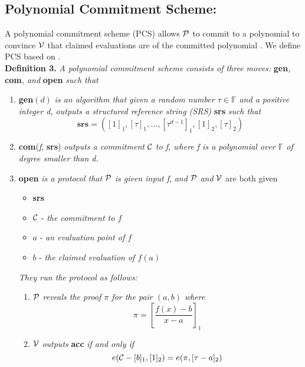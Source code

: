 \subsection{Polynomial Commitment Scheme:}\label{sec:pcs} A polynomial commitment scheme (PCS) allows $\mathcal{P}$ to commit to a polynomial to convince $\mathcal{V}$ that claimed evaluations are of the committed polynomial \cite{kzg}. We define PCS based on \cite{kzg,plonk,bdfg}. \\
\textbf{Definition 3.} \textit{A polynomial commitment scheme consists of three moves:} \textbf{gen}\textit{,} \textbf{com}\textit{, and} \textbf{open} \textit{such that}
\begin{enumerate}
    \item \textbf{gen}$(d)$ \textit{is an algorithm that given a random number $\tau\in\mathbb{F}$ and a positive integer d, outputs a structured reference string (SRS)} \textbf{srs} \textit{such that} 
    \[ \textbf{srs}=([1]_1,[\tau]_1,\dots,[\tau^{d-1}]_1,[1]_2,[\tau]_2) \]
    \item \textbf{com}(\textit{f}, \textbf{srs}) \textit{outputs a commitment} $\mathcal{C}$ \textit{to f, where f is a polynomial over $\mathbb{F}$ of degree smaller than d.}
    \item \textbf{open} \textit{is a protocol that} $\mathcal{P}$ \textit{is given input f}, \textit{and} $\mathcal{P}$ \textit{and} $\mathcal{V}$ are both given
    \begin{itemize}
        \item \textbf{srs}
        \item $\mathcal{C}$ - \textit{the commitment to $f$}
        \item $a$ - \textit{an evaluation point of $f$}
        \item $b$ - \textit{the claimed evaluation of $f(a)$}
    \end{itemize}
    \textit{They run the protocol as follows:}
    \begin{enumerate}
        \item $\mathcal{P}$ \textit{reveals the proof $\pi$ for the pair $(a,b)$ where}
        \[ \pi=[\frac{f(x)-b}{x-a}]_1 \]
        \item $\mathcal{V}$ \textit{outputs} \textbf{acc} \textit{if and only if}
        \[ e(\mathcal{C}-[b]_1,[1]_2)=e(\pi,[\tau-a]_2) \]
    \end{enumerate}
\end{enumerate}
